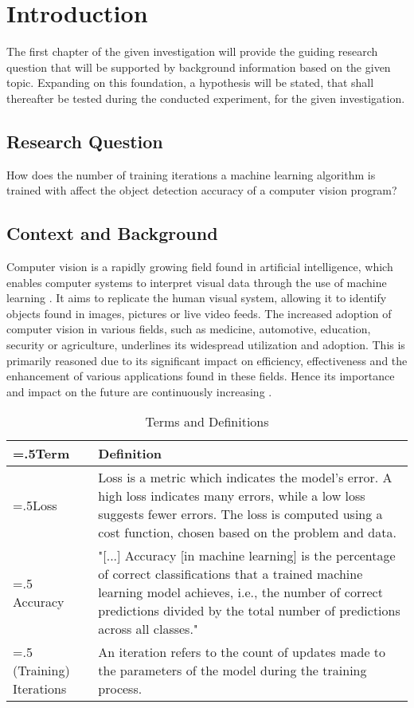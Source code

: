 

\section{Introduction}
The first chapter of the given investigation will provide the guiding research question that will be supported by background information based on the given topic. Expanding on this foundation, a hypothesis will be stated, that shall thereafter be tested during the conducted experiment, for the given investigation.

\subsection{Research Question}
How does the number of training iterations a machine learning algorithm is trained with affect the object detection accuracy of a computer vision program?

\subsection{Context and Background}
Computer vision is a rapidly growing field found in artificial intelligence, which enables computer systems to interpret visual data through the use of machine learning \parencite[pp.~2--5]{Sultana2020}. It aims to replicate the human visual system, allowing it to identify objects found in images, pictures or live video feeds. The increased adoption of computer vision in various fields, such as medicine, automotive, education, security or agriculture, underlines its widespread utilization and adoption. This is primarily reasoned due to its significant impact on efficiency, effectiveness and the enhancement of various applications found in these fields. Hence its importance and impact on the future are continuously increasing \parencite[pp.~1--3, 85--95]{Szeliski2022}. 

\begin{table}[h]
\centering
\begin{tabularx}{\textwidth}{|>{\hsize=.5\hsize}X|>{\hsize=1.5\hsize}X|}
\hline
\textbf{Term} & \textbf{Definition} \\
\hline
Loss & 
Loss is a metric which indicates the model's error. A high loss indicates many errors, while a low loss suggests fewer errors. 
The loss is computed using a cost function, chosen based on the problem and data. \parencite{Baeldung2022}
\\
\hline
Accuracy &
"[...] Accuracy [in machine learning] is the percentage of correct classifications that a trained machine learning model achieves, i.e., 
the number of correct predictions divided by the total number of predictions across all classes." \parencite{Iguazio}
\\
\hline
(Training) Iterations & 
An iteration refers to the count of updates made to the parameters of the model during the training process. \parencite{Paperspace}
\\
\hline

\end{tabularx}
\caption{Terms and Definitions}
\label{tab:terms-and-definitions}
\end{table}

